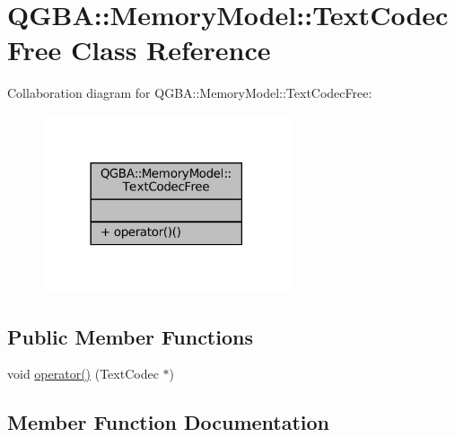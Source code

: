 \hypertarget{class_q_g_b_a_1_1_memory_model_1_1_text_codec_free}{}\section{Q\+G\+BA\+:\+:Memory\+Model\+:\+:Text\+Codec\+Free Class Reference}
\label{class_q_g_b_a_1_1_memory_model_1_1_text_codec_free}


Collaboration diagram for Q\+G\+BA\+:\+:Memory\+Model\+:\+:Text\+Codec\+Free\+:
\nopagebreak
\begin{figure}[H]
\begin{center}
\leavevmode
\includegraphics[width=206pt]{class_q_g_b_a_1_1_memory_model_1_1_text_codec_free__coll__graph}
\end{center}
\end{figure}
\subsection*{Public Member Functions}
\begin{DoxyCompactItemize}
\item 
void \mbox{\hyperlink{class_q_g_b_a_1_1_memory_model_1_1_text_codec_free_a141450e588f475dbc2c20585867cbfb3}{operator()}} (Text\+Codec $\ast$)
\end{DoxyCompactItemize}


\subsection{Member Function Documentation}
\mbox{\label{class_q_g_b_a_1_1_memory_model_1_1_text_codec_free_a141450e588f475dbc2c20585867cbfb3}} 

